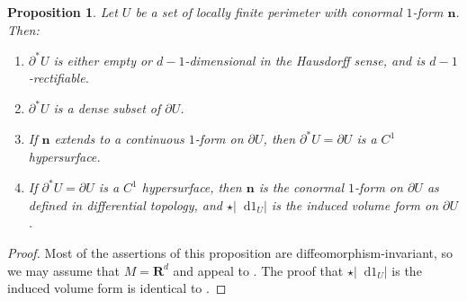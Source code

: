 \documentclass[reqno,10pt]{amsart}
\newcommand{\RR}{\mathbf{R}}
\newcommand*\dif{\mathop{}\!\mathrm{d}}
\newcommand{\normal}{\mathbf n}
\newtheorem{proposition}[theorem]{Proposition}
\theoremstyle{definition}
\numberwithin{equation}{section}
\begin{document}
\begin{proposition}\label{locality of Caccioppoli}
    Let $U$ be a set of locally finite perimeter with conormal $1$-form $\normal$.
    Then:
    \begin{enumerate}
    \item $\partial^* U$ is either empty or $d-1$-dimensional in the Hausdorff sense, and is $d-1$-rectifiable.
    \item $\partial^* U$ is a dense subset of $\partial U$.
    \item If $\normal$ extends to a continuous $1$-form on $\partial U$, then $\partial^* U = \partial U$ is a $C^1$ hypersurface.
    \item If $\partial^* U = \partial U$ is a $C^1$ hypersurface, then $\normal$ is the conormal $1$-form on $\partial U$ as defined in differential topology, and $\star |\dif 1_U|$ is the induced volume form on $\partial U$.
\end{enumerate}
\end{proposition}
\begin{proof}
Most of the assertions of this proposition are diffeomorphism-invariant, so we may assume that $M = \RR^d$ and appeal to \cite[Chapters 2-4]{Giusti77}.
The proof that $\star |\dif 1_U|$ is the induced volume form is identical to \cite[Example 1.4]{Giusti77}.
\end{proof}
\end{document}
